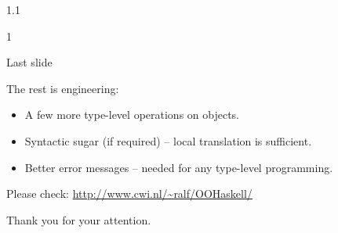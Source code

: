 \documentclass{slides}
\newenvironment{myslide}{\begin{slide}\color{Blue}\begin{boxedminipage}{1.1\hsize}\begin{boxedminipage}{1\hsize}\color{Black}
\vspace{-170\in}
}{%
\smallskip
\end{boxedminipage}
\end{boxedminipage}
\end{slide}}
\newenvironment{myslide}{\begin{slide}
}{%
\end{slide}}
\newenvironment{myslide}{\begin{slide}\color{White}\begin{boxedminipage}{1.1\hsize}\color{Black}
\vspace{-170\in}
}{%
\smallskip
\end{boxedminipage}
\end{slide}}
\newcommand{\header}[1]{{\large \color{Red} #1}}
\begin{document}



\begin{myslide}

\bigskip
\bigskip
\bigskip

\header{Last slide}

{\small

The rest is engineering:

\begin{itemize}
\item A few more type-level operations on objects.
\item Syntactic sugar (if required) -- local translation is sufficient.
\item Better error messages -- needed for any type-level programming.
\end{itemize}

Please check: \url{http://www.cwi.nl/~ralf/OOHaskell/}

Thank you for your attention.

}

\end{myslide}



\end{document}
